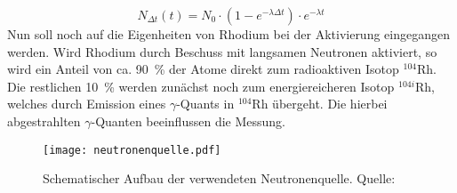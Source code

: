 %
\begin{equation}
N_{\Delta t}(t) = N_0 \cdot (1- e^{-\lambda \Delta t}) \cdot e^{-\lambda t}
\label{eq:a}
\end{equation}
%
Nun soll noch auf die Eigenheiten von Rhodium bei der Aktivierung eingegangen werden.
Wird Rhodium durch Beschuss mit langsamen Neutronen aktiviert, so wird ein Anteil von ca. \SI{90}{\percent} der Atome direkt zum radioaktiven Isotop ${}^{104}$Rh. Die restlichen \SI{10}{\percent} werden zunächst noch zum energiereicheren Isotop ${}^{104i}$Rh, welches durch Emission eines $\gamma$-Quants in  ${}^{104}$Rh übergeht. Die hierbei abgestrahlten $\gamma$-Quanten beeinflussen die Messung.
%
\begin{figure}[h]
\centering
\texttt{[image: neutronenquelle.pdf]}
\caption{Schematischer Aufbau der verwendeten Neutronenquelle. Quelle: \textcite{v702}}
\label{fig:neutronenquelle}
\end{figure}
%